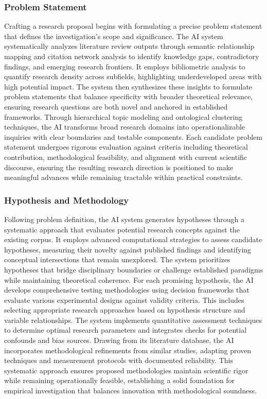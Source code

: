 \subsubsection*{Problem Statement}

Crafting a research proposal begins with formulating a precise problem statement that defines the investigation's scope and significance. The AI system systematically analyzes literature review outputs through semantic relationship mapping and citation network analysis to identify knowledge gaps, contradictory findings, and emerging research frontiers. It employs bibliometric analysis to quantify research density across subfields, highlighting underdeveloped areas with high potential impact. The system then synthesizes these insights to formulate problem statements that balance specificity with broader theoretical relevance, ensuring research questions are both novel and anchored in established frameworks. Through hierarchical topic modeling and ontological clustering techniques, the AI transforms broad research domains into operationalizable inquiries with clear boundaries and testable components. Each candidate problem statement undergoes rigorous evaluation against criteria including theoretical contribution, methodological feasibility, and alignment with current scientific discourse, ensuring the resulting research direction is positioned to make meaningful advances while remaining tractable within practical constraints.

\subsubsection*{Hypothesis and Methodology}

Following problem definition, the AI system generates hypotheses through a systematic approach that evaluates potential research concepts against the existing corpus. It employs advanced computational strategies to assess candidate hypotheses, measuring their novelty against published findings and identifying conceptual intersections that remain unexplored. The system prioritizes hypotheses that bridge disciplinary boundaries or challenge established paradigms while maintaining theoretical coherence. For each promising hypothesis, the AI develops comprehensive testing methodologies using decision frameworks that evaluate various experimental designs against validity criteria. This includes selecting appropriate research approaches based on hypothesis structure and variable relationships. The system implements quantitative assessment techniques to determine optimal research parameters and integrates checks for potential confounds and bias sources. Drawing from its literature database, the AI incorporates methodological refinements from similar studies, adapting proven techniques and measurement protocols with documented reliability. This systematic approach ensures proposed methodologies maintain scientific rigor while remaining operationally feasible, establishing a solid foundation for empirical investigation that balances innovation with methodological soundness.

